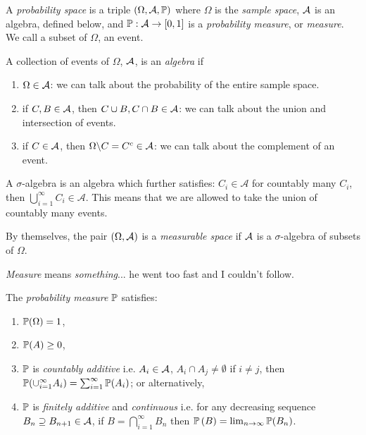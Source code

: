 \documentclass[11pt]{article}
\begin{document}
	\tableofcontents
	\newpage
	
	\begin{definition}
		A \emph{probability space} is a triple $(\Omega, \mathcal{A}, \mathbb{P})$ where $\Omega$ is the \emph{sample space}, $\mathcal{A}$ is an algebra, defined below, and $\mathbb{P}: \mathcal{A} \rightarrow [0,1]$ is a \emph{probability measure}, or \emph{measure}. We call a subset of $\Omega$, an event. 
		
		A collection of events of $\Omega$, $\mathcal{A}$, is an \emph{algebra} if
		\begin{enumerate}
			\item $\Omega \in \mathcal{A}$: we can talk about the probability of the entire sample space. 
			\item if $C, B \in \mathcal{A}$, then $C \cup B, C \cap B \in \mathcal{A}$: we can talk about the union and intersection of events.
			\item if $C \in \mathcal{A}$, then $\Omega \backslash C = C^{c} \in \mathcal{A}$: we can talk about the complement of an event. 
		\end{enumerate}
		A $\sigma$-algebra is an algebra which further satisfies: $C_i \in \mathcal{A}$ for countably many $C_i$, then $\bigcup_{i=1}^{\infty} C_i \in \mathcal{A}$. This means that we are allowed to take the union of countably many events.
		
		By themselves, the pair $(\Omega, \mathcal{A})$ is a \emph{measurable space} if $\mathcal{A}$ is a $\sigma$-algebra of subsets of $\Omega$. 
		
		\emph{Measure} means \emph{something}... he went too fast and I couldn't follow. 
		
		The \emph{probability measure} $\mathbb{P}$ satisfies: 
		\begin{enumerate}
			\item $\mathbb{P}(\Omega) = 1$,
			\item $\mathbb{P}(A) \geq 0$,
			\item $\mathbb{P}$ is \emph{countably additive} i.e. $A_i \in \mathcal{A}$, $A_i \cap A_j \neq \emptyset$ if $i \neq j$, then $\mathbb{P}(\cup^{\infty}_{i = 1}A_i) = \sum_{i=1}^{\infty} \mathbb{P}(A_i)$; or alternatively,
			\item $\mathbb{P}$ is \emph{finitely additive} and \emph{continuous} i.e. for any decreasing sequence $B_n \supseteq B_{n+1} \in \mathcal{A}$, if $B = \bigcap^{\infty}_{i=1}B_n$ then $\mathbb{P}\left(B\right) = \lim_{n\rightarrow \infty} \mathbb{P}(B_n)$.
		\end{enumerate}
	\end{definition}
	
\end{document}
